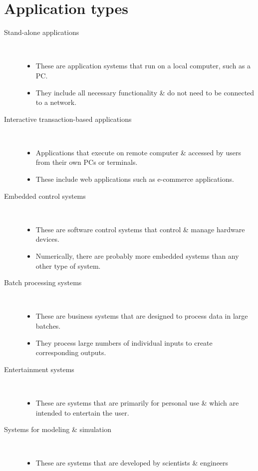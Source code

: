 \documentclass{report}
\begin{document}
\section{Application types}
\begin{description}
  \item [Stand-alone applications] \
  \begin{itemize}
    \item These are application systems that run on a local computer, such as a PC.
    \item They include all necessary functionality \& do not need to be connected to a
network.
  \end{itemize}
  \item [Interactive transaction-based applications] \
  \begin{itemize}
    \item Applications that execute on remote computer \& accessed by users from
their own PCs or terminals.
	\item These include web applications such as e-commerce applications.
  \end{itemize}
  \item [Embedded control systems] \
  \begin{itemize}
    \item These are software control systems that control \& manage hardware devices.
    \item Numerically, there are probably more embedded systems than any other type of
system.
  \end{itemize}
  \item [Batch processing systems] \
  \begin{itemize}
    \item These are business systems that are designed to process data in
large batches.
    \item They process large numbers of individual inputs to create
corresponding outputs.
  \end{itemize}
  \item [Entertainment systems] \
  \begin{itemize}
    \item These are systems that are primarily for personal use \& which
are intended to entertain the user.
  \end{itemize}
  \item [Systems for modeling \& simulation] \
  \begin{itemize}
    \item These are systems that are developed by scientists \& engineers

\end{itemize}
\end{description}
\end{document}
